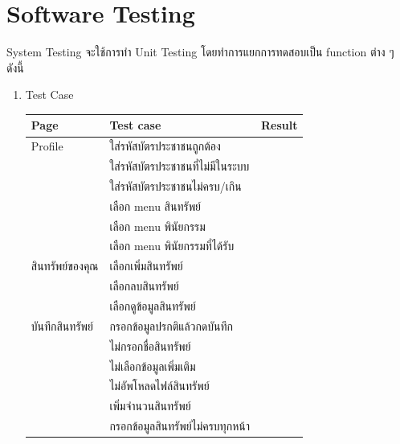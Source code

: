 \documentclass[12pt,oneside,openright,a4paper]{cpe-thai-project}
\begin{document}
\section{Software Testing}
\tab System Testing จะใช้การทำ Unit Testing โดยทำการแยกการทดสอบเป็น function ต่าง ๆ ดังนี้
\begin{enumerate}[label=\thesection.\arabic*,leftmargin=0pt,itemindent=1.25cm]
\item Test Case
\begin{table}[h]
\begin{tabular}{|l|l|l|}
\hline
Page                   & Test case                                        &  Result \\ \hline
Profile                & ใส่รหัสบัตรประชาชนถูกต้อง                        &        \\ \hline
                       & ใส่รหัสบัตรประชาชนที่ไม่มีในระบบ                 &        \\ \hline
                       & ใส่รหัสบัตรประชาชนไม่ครบ/เกิน                    &        \\ \hline
                       & เลือก menu สินทรัพย์                             &        \\ \hline
                       & เลือก menu พินัยกรรม                             &        \\ \hline
                       & เลือก menu พินัยกรรมที่ได้รับ                    &        \\ \hline
สินทรัพย์ของคุณ        & เลือกเพิ่มสินทรัพย์                              &        \\ \hline
                       & เลือกลบสินทรัพย์                                 &        \\ \hline
                       & เลือกดูข้อมูลสินทรัพย์                           &        \\ \hline
บันทึกสินทรัพย์        & กรอกข้อมูลปรกติแล้วกดบันทึก                      &        \\ \hline
                       & ไม่กรอกชื่อสินทรัพย์                             &        \\ \hline
                       & ไม่เลือกข้อมูลเพิ่มเติม                          &        \\ \hline
                       & ไม่อัพโหลดไฟล์สินทรัพย์                        &        \\ \hline
                       & เพิ่มจำนวนสินทรัพย์                              &        \\ \hline
                       & กรอกข้อมูลสินทรัพย์ไม่ครบทุกหน้า                 &        \\ \hline

\end{tabular}
\end{table}
\end{enumerate}
\end{document}
